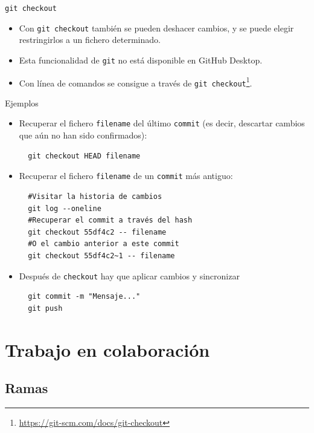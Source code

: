 \documentclass[aspectratio=169, xcolor={usenames,svgnames,dvipsnames}]{beamer}
\begin{document}
\begin{frame}[label={sec:orgc2cbe71},fragile]{\texttt{git checkout}}
 \begin{itemize}
\item Con \texttt{git checkout} también se pueden deshacer cambios, y se puede elegir restringirlos a un fichero determinado.
\item Esta funcionalidad de \texttt{git} no está disponible en GitHub Desktop.
\item Con línea de comandos se consigue a través de \texttt{git checkout}\footnote{\url{https://git-scm.com/docs/git-checkout}}.
\end{itemize}
\end{frame}
\begin{frame}[label={sec:orgcb1ba31},fragile]{Ejemplos}
 \begin{itemize}
\item Recuperar el fichero \texttt{filename} del último \texttt{commit} (es decir, descartar cambios que aún no han sido confirmados):
\lstset{language=sh,label= ,caption= ,captionpos=b,numbers=none}
\begin{lstlisting}
  git checkout HEAD filename
\end{lstlisting}

\item Recuperar el fichero \texttt{filename} de un \texttt{commit} más antiguo:
\lstset{language=sh,label= ,caption= ,captionpos=b,numbers=none}
\begin{lstlisting}
  #Visitar la historia de cambios
  git log --oneline
  #Recuperar el commit a través del hash
  git checkout 55df4c2 -- filename
  #O el cambio anterior a este commit
  git checkout 55df4c2~1 -- filename
\end{lstlisting}

\item Después de \texttt{checkout} hay que aplicar cambios y sincronizar
\lstset{language=sh,label= ,caption= ,captionpos=b,numbers=none}
\begin{lstlisting}
  git commit -m "Mensaje..."
  git push
\end{lstlisting}
\end{itemize}
\end{frame}
\section{Trabajo en colaboración}
\label{sec:org20273f6}
\subsection{Ramas}
\label{sec:org8f24b42}
\end{document}

